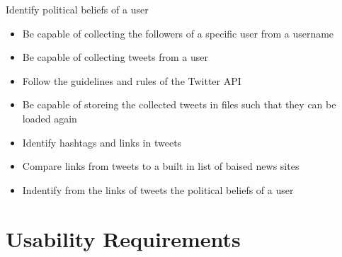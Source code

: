 \begin{requirement}{Identify political beliefs of a user }

\end{requirement}
\begin{itemize}
 \item Be capable of collecting the followers of a specific user from a username
 \item Be capable of collecting tweets from a user
 \item Follow the guidelines and rules of the Twitter API
 \item Be capable of storeing the collected tweets in files such that they can
 be loaded again
 \item Identify hashtags and links in tweets
 \item Compare links from tweets to a built in list of baised news sites
 \item Indentify from the links of tweets the political beliefs of a user
\end{itemize}

\section{Usability Requirements}
